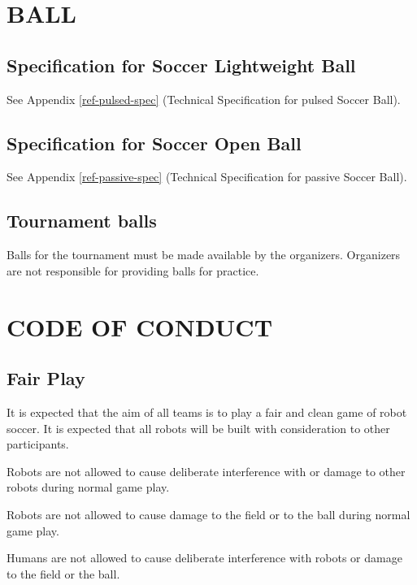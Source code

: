 \documentclass{article}
\begin{document}
\section{BALL \label{ref-038}}

\subsection{Specification for Soccer Lightweight Ball}

See Appendix \ref{ref-pulsed-spec} (Technical Specification for pulsed Soccer
Ball).

\subsection{Specification for Soccer Open Ball}

See Appendix \ref{ref-passive-spec} (Technical Specification for passive Soccer
Ball).

\subsection{ Tournament balls \label{ref-039}}

Balls for the tournament must be made available by the organizers. Organizers
are not responsible for providing balls for practice.

\section{CODE OF CONDUCT\label{ref-040}}

\subsection{ Fair Play \label{ref-041}}

It is expected that the aim of all teams is to play a fair and clean game of
robot soccer. It is expected that all robots will be built with consideration
to other participants.

Robots are not allowed to cause deliberate interference with or damage to other
robots during normal game play.

Robots are not allowed to cause damage to the field or to the ball during
normal game play.


Humans are not allowed to cause deliberate interference with robots or damage
to the field or the ball.
\end{document}

